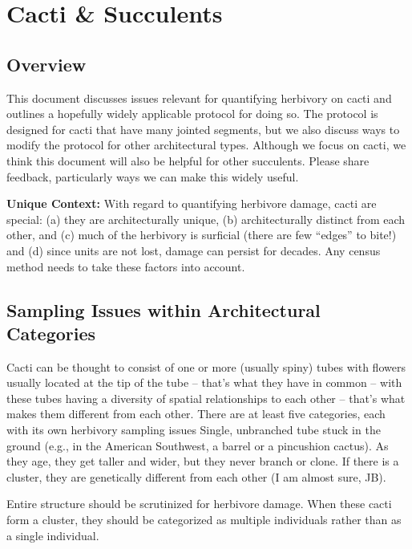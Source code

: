 \documentclass[
  letterpaper,
  DIV=11,
  numbers=noendperiod]{scrreprt}
\begin{document}
\chapter{Cacti \& Succulents}\label{sec-succulents}

\section{Overview}\label{overview-2}

This document discusses issues relevant for quantifying herbivory on
cacti and outlines a hopefully widely applicable protocol for doing so.
The protocol is designed for cacti that have many jointed segments, but
we also discuss ways to modify the protocol for other architectural
types. Although we focus on cacti, we think this document will also be
helpful for other succulents. Please share feedback, particularly ways
we can make this widely useful.

\textbf{Unique Context: } With regard to quantifying herbivore damage,
cacti are special: (a) they are architecturally unique, (b)
architecturally distinct from each other, and (c) much of the herbivory
is surficial (there are few ``edges'' to bite!) and (d) since units are
not lost, damage can persist for decades. Any census method needs to
take these factors into account.

\section{Sampling Issues within Architectural
Categories}\label{sampling-issues-within-architectural-categories}

Cacti can be thought to consist of one or more (usually spiny) tubes
with flowers usually located at the tip of the tube -- that's what they
have in common -- with these tubes having a diversity of spatial
relationships to each other -- that's what makes them different from
each other. There are at least five categories, each with its own
herbivory sampling issues Single, unbranched tube stuck in the ground
(e.g., in the American Southwest, a barrel or a pincushion cactus). As
they age, they get taller and wider, but they never branch or clone. If
there is a cluster, they are genetically different from each other (I am
almost sure, JB).

Entire structure should be scrutinized for herbivore damage. When these
cacti form a cluster, they should be categorized as multiple individuals
rather than as a single individual.
\end{document}
